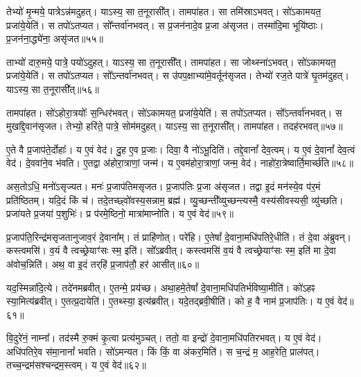 तेभ्यो॑ मृ॒न्मये॒ पात्रे\-ऽन्न॑मदुहत्।
याऽस्य॒ सा त॒नूरासी᳚त्।
तामपा॑हत।
सा तमि॑स्रा\-ऽभवत्।
सो॑ऽकामयत॒ प्रजा॑ये॒येति॑।
स तपो॑\-ऽतप्यत।
सो᳚न्तर्वा॑नभवत्।
स प्र॒जन॑नादे॒व प्र॒जा अ॑\-सृजत।
तस्मा॑दि॒मा भूयि॑ष्ठाः।
प्र॒जन॑ना॒द्ध्ये॑ना॒ असृ॑जत॥५५॥

ताभ्यो॑ दारु॒मये॒ पात्रे॒ पयो॑\-ऽदुहत्।
याऽस्य॒ सा त॒नूरासी᳚त्।
तामपा॑हत।
सा जोथ्स्ना॑\-ऽभवत्।
सो॑ऽकामयत॒ प्रजा॑ये॒येति॑।
स तपो॑\-ऽतप्यत।
सो᳚ऽन्तर्वा॑नभवत्।
स उ॑पप॒क्षाभ्या॑मे॒वर्तून॑\-सृजत।
तेभ्यो॑ रज॒ते पात्रे॑ घृ॒तम॑दुहत्।
याऽस्य॒ सा त॒नूरासी᳚त्॥५६॥

तामपा॑हत।
सो॑ऽहोरा॒त्रयोः᳚ स॒न्धिर॑भवत्।
सो॑ऽकामयत॒ प्रजा॑ये॒येति॑।
स तपो॑\-ऽतप्यत।
सो᳚ऽन्तर्वा॑नभवत्।
स मुखा᳚द्दे॒वान॑\-सृजत।
तेभ्यो॒ हरि॑ते॒ पात्रे॒ सोम॑मदुहत्।
याऽस्य॒ सा त॒नूरासी᳚त्।
तामपा॑हत।
तदह॑रभवत्॥५७॥

ए॒ते वै प्र॒जा\-प॑ते॒र्दोहाः᳚।
य ए॒वं वेद॑।
दु॒ह ए॒व प्र॒जाः।
दिवा॒ वै नो॑\-ऽभू॒दिति॑।
तद्दे॒वानां᳚ देव॒त्वम्।
य ए॒वं दे॒वानां᳚ देव॒त्वं वेद॑।
दे॒ववा॑ने॒व भ॑वति।
ए॒तद्वा अ॑होरा॒त्राणां॒ जन्म॑।
य ए॒वम॑होरा॒त्राणां॒ जन्म॒ वेद॑।
नाहो॑रा॒त्रेष्वार्ति॒मार्च्छ॑ति॥५८॥

अस॒तोऽधि॒ मनो॑\-ऽसृज्यत।
मनः॑ प्र॒जा\-प॑तिम\-सृजत।
प्र॒जा\-प॑तिः प्र॒जा अ॑\-सृजत।
तद्वा इ॒दं मन॑स्ये॒व प॑र॒मं प्रति॑\-ष्ठितम्।
यदि॒दं किं च॑।
तदे॒तच्छ्वो॑वस्य॒सन्नाम॒ ब्रह्म॑।
व्यु॒च्छन्ती᳚व्युच्छन्त्यस्मै॒ वस्य॑सीवस्यसी॒ व्यु॑च्छति।
प्रजा॑यते प्र॒जया॑ प॒शुभिः॑।
प्र प॑रमे॒ष्ठिनो॒ मात्रा॑माप्नोति।
य ए॒वं वेद॑॥५९॥

प्र॒जा\-प॑ति॒रिन्द्र॑म\-सृजतानुजाव॒रं दे॒वाना᳚म्।
तं प्राहि॑णोत्।
परे॑हि।
ए॒तेषां᳚ दे॒वाना॒मधि॑पतिरे॒धीति॑।
तं दे॒वा अ॑ब्रुवन्।
कस्त्वमसि॑।
व॒यं वै त्वच्छ्रेयाꣳ॑सः स्म॒ इति॑।
सो᳚ऽब्रवीत्।
कस्त्वमसि॑ व॒यं वै त्वच्छ्रेयाꣳ॑सः स्म॒ इति॑ मा दे॒वा अ॑वोच॒न्निति॑।
अथ॒ वा इ॒दं तर्‌\mbox{}हि॑ प्र॒जा\-प॑तौ॒ हर॑ आसीत्॥६०॥

यद॒स्मिन्ना॑दि॒त्ये।
तदे॑नमब्रवीत्।
ए॒तन्मे॒ प्रय॑च्छ।
अथा॒हमे॒तेषां᳚ दे॒वाना॒मधि॑पतिर्भविष्या॒मीति॑।
को॑ऽहꣴ स्या॒मित्य॑ब्रवीत्।
ए॒तत्प्र॒दायेति॑।
ए॒तथ्स्या॒ इत्य॑ब्रवीत्।
यदे॒तद्ब्रवी॒षीति॑।
को ह॒ वै नाम॑ प्र॒जा\-प॑तिः।
य ए॒वं वेद॑॥६१॥

वि॒दुरे॑नं॒ नाम्ना᳚।
तद॑स्मै रु॒क्मं कृ॒त्वा प्रत्य॑मुञ्चत्।
ततो॒ वा इन्द्रो॑ दे॒वाना॒मधि॑पतिरभवत्।
य ए॒वं वेद॑।
अधि॑पतिरे॒व स॑मा॒नानां᳚ भवति।
सो॑ऽमन्यत।
किं किं॒ वा अ॑कर॒मिति॑।
स च॒न्द्रं म॒ आह॒रेति॒ प्राल॑पत्।
तच्च॒न्द्रम॑सश्चन्द्रम॒स्त्वम्।
य ए॒वं वेद॑॥६२॥

